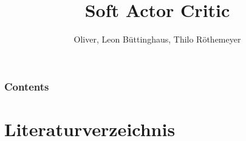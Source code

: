 \documentclass[11pt]{beamer}
\author{Oliver, Leon Büttinghaus, Thilo Röthemeyer}
\title{Soft Actor Critic}
\begin{document}
\begin{frame}
\titlepage
\end{frame}


\begin{frame}
    \frametitle{Contents}
    \tableofcontents
\end{frame}





\section{Literaturverzeichnis}
\begin{frame}
\nocite{SAC18}


\end{frame}
\end{document}
